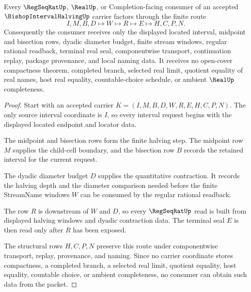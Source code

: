 \begin{theorem}
\label{thm:bishop-interval-halving-real-seal-route}
Every $\RegSeqRatUp$, $\RealUp$, or Completion-facing consumer of an accepted $\BishopIntervalHalvingUp$ carrier factors through the finite route
$$
I,M,B,D \longmapsto W \longmapsto R \longmapsto E \longmapsto H,C,P,N .
$$
Consequently the consumer receives only the displayed located interval, midpoint and bisection rows, dyadic diameter budget, finite stream windows, regular rational readback, terminal real seal, componentwise transport, continuation replay, package provenance, and local naming data. It receives no open-cover compactness theorem, completed branch, selected real limit, quotient equality of real names, host real equality, countable-choice schedule, or ambient $\RealUp$ completeness.
\end{theorem}
\begin{proof}
Start with an accepted carrier $K=(I,M,B,D,W,R,E,H,C,P,N)$. The only source interval coordinate is $I$, so every interval request begins with the displayed located endpoint and locator data.

The midpoint and bisection rows form the finite halving step. The midpoint row $M$ supplies the child-cell boundary, and the bisection row $B$ records the retained interval for the current request.

The dyadic diameter budget $D$ supplies the quantitative contraction. It records the halving depth and the diameter comparison needed before the finite StreamName windows $W$ can be consumed by the regular rational readback.

The row $R$ is downstream of $W$ and $D$, so every $\RegSeqRatUp$ read is built from displayed halving windows and dyadic contraction data. The terminal seal $E$ is then read only after $R$ has been exposed.

The structural rows $H,C,P,N$ preserve this route under componentwise transport, replay, provenance, and naming. Since no carrier coordinate stores compactness, a completed branch, a selected real limit, quotient equality, host equality, countable choice, or ambient completeness, no consumer can obtain such data from the packet.
\end{proof}


